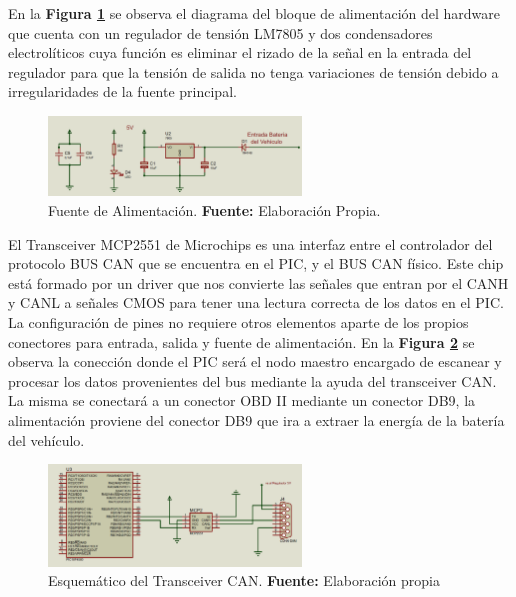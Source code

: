 En la \textbf{Figura \ref{Esch1}} se observa el diagrama del bloque de alimentación del hardware que cuenta con un regulador de tensión LM7805 y dos condensadores electrolíticos cuya función es eliminar el rizado de la señal en la entrada del regulador para que la tensión de salida no tenga variaciones de tensión debido a irregularidades de la fuente principal. 

\begin{figure}[H]
	\centering
		\includegraphics[width=0.6\textwidth]{./Cap4imagen/Fuente5v_4.png}
	\caption[Fuente de Alimentación.]{Fuente de Alimentación.\textbf{ Fuente:} 
	Elaboración Propia.}
	\label{Esch1} %
\end{figure}




El Transceiver MCP2551 de Microchips es una interfaz entre el controlador del protocolo BUS CAN que se encuentra en el PIC, y el BUS CAN físico. Este chip está formado por un driver que nos convierte las señales que entran por el CANH  y CANL a señales CMOS para tener una lectura correcta de los datos en el PIC. La configuración de pines no requiere otros elementos aparte de los propios conectores para  entrada, salida y fuente de alimentación. En la \textbf{Figura \ref{Esch2}} se observa la conección donde el PIC será el nodo maestro encargado de escanear y procesar los datos provenientes del bus mediante la ayuda del transceiver CAN. La misma se conectará a un conector OBD II mediante un conector DB9, la alimentación proviene del conector DB9 que ira a extraer la energía de la batería del vehículo.


\begin{figure}[H]
	\centering
		\includegraphics[width=0.6\textwidth]{./Cap4imagen/pic_y_mcp_4.png}
	\caption[Esquemático del Transceiver CAN.]{Esquemático del Transceiver CAN.\textbf{ Fuente:} 
		Elaboración propia}
	\label{Esch2} %
\end{figure}

